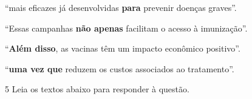 \begin{escolha}

    \item ``mais eficazes já desenvolvidas \textbf{para} prevenir doenças graves''.

    \item ``Essas campanhas \textbf{não apenas} facilitam o acesso à imunização''.

    \item ``\textbf{Além disso}, as vacinas têm um impacto econômico positivo''.

    \item ``\textbf{uma vez que} reduzem os custos associados ao tratamento''.

\end{escolha}

\num{5} Leia os textos abaixo para responder à questão. 

